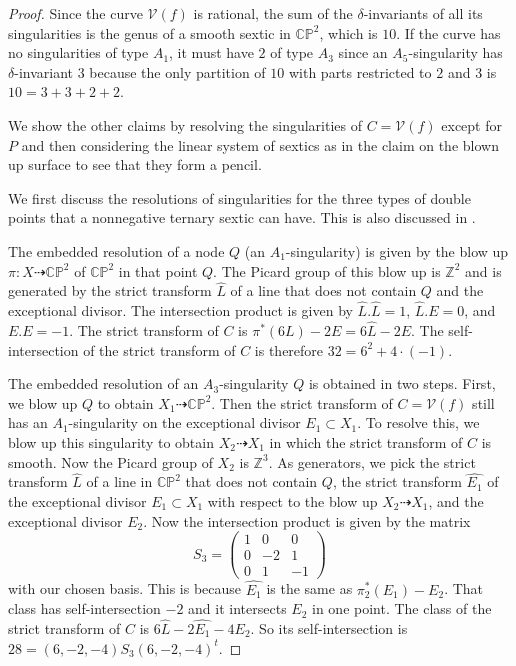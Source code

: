 \documentclass[a4paper]{article}
\numberwithin{equation}{section}
\newcommand{\Z}{\mathbb{Z}}
\newcommand{\C}{\mathbb{C}}
\renewcommand{\P}{\mathbb{P}}
\newcommand{\V}{\mathcal{V}}
\newcommand{\wh}{\widehat}
\newcommand{\ratto}{\dashrightarrow}
\theoremstyle{definition}
\theoremstyle{remark}
\begin{document}
\begin{proof}
Since the curve $\V(f)$ is rational, the sum of the $\delta$-invariants of all its singularities is the genus of a smooth sextic in $\C\P^2$, which is $10$. If the curve has no singularities of type $A_1$, it must have $2$ of type $A_3$ since an $A_5$-singularity has $\delta$-invariant $3$ because the only partition of $10$ with parts restricted to $2$ and $3$ is $10 = 3+3+2+2$.

We show the other claims by resolving the singularities of $C = \V(f)$ except for $P$ and then considering the linear system of sextics as in the claim on the blown up surface to see that they form a pencil. 

We first discuss the resolutions of singularities for the three types of double points that a nonnegative ternary sextic can have. This is also discussed in \cite[Sec. V.3]{Hartshorne}.

The embedded resolution of a node $Q$ (an $A_1$-singularity) is given by the blow up $\pi\colon X\ratto \C\P^2$ of $\C\P^2$ in that point $Q$. The Picard group of this blow up is $\Z^2$ and is generated by the strict transform $\wh{L}$ of a line that does not contain $Q$ and the exceptional divisor. The intersection product is given by $\wh{L}.\wh{L} = 1$, $\wh{L}.E = 0$, and $E.E = -1$. The strict transform of $C$ is $\pi^*(6L) - 2E = 6\wh{L} - 2E$. The self-intersection of the strict transform of $C$ is therefore $32 = 6^2 + 4 \cdot(-1)$.

The embedded resolution of an $A_3$-singularity $Q$ is obtained in two steps. First, we blow up $Q$ to obtain $X_1\ratto \C\P^2$. Then the strict transform of $C = \V(f)$ still has an $A_1$-singularity on the exceptional divisor $E_1\subset X_1$. To resolve this, we blow up this singularity to obtain $X_2 \ratto X_1$ in which the strict transform of $C$ is smooth. Now the Picard group of $X_2$ is $\Z^3$. As generators, we pick the strict transform $\wh{L}$ of a line in $\C\P^2$ that does not contain $Q$, the strict transform $\wh{E_1}$ of the exceptional divisor $E_1\subset X_1$ with respect to the blow up $X_2\ratto X_1$, and the exceptional divisor $E_2$. Now the intersection product is given by the matrix
\[ 
S_3 = \begin{pmatrix}
1 & 0 & 0 \\
0 & -2 & 1 \\
0 & 1 & -1
\end{pmatrix}\]
with our chosen basis. This is because $\wh{E_1}$ is the same as $\pi_2^*(E_1) - E_2$. That class has self-intersection $-2$ and it intersects $E_2$ in one point.
The class of the strict transform of $C$ is $6 \wh{L} - 2\wh{E_1} - 4 E_2$. So its self-intersection is $28 = (6,-2,-4) S_3 (6,-2,-4)^t$.


\end{proof}
\end{document}
